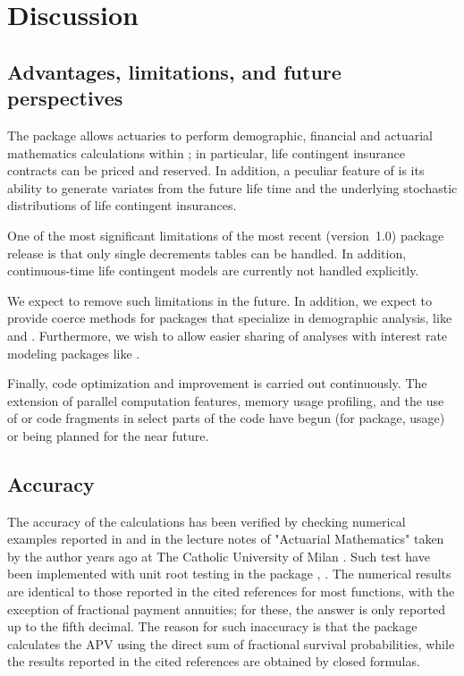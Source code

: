 \documentclass[nojss]{jss}
\begin{document}
\section{Discussion}\label{sec:discussion}
\subsection{Advantages, limitations, and future perspectives}

The  package allows actuaries to perform
demographic, financial and actuarial mathematics calculations within
; in particular, life contingent insurance contracts can
be priced and reserved. In addition, a peculiar feature of
 is its ability to generate variates from the
future life time and the underlying stochastic distributions of life
contingent insurances.

One of the most significant limitations of the most recent
(version~1.0)  package release is that only
single decrements tables can be handled.  In addition, continuous-time
life contingent models are currently not handled explicitly.

We expect to remove such limitations in the future. In addition, we
expect to provide coerce methods for packages that specialize in
demographic analysis, like  and
. Furthermore, we wish to allow easier sharing of
analyses with interest rate modeling packages like .

Finally, code optimization and improvement is carried out
continuously. The extension of parallel computation features, memory
usage profiling, and the use of  or  code
fragments in select parts of the code have begun (for  package, \cite{RcppR} usage) or being 
planned for the near future.

\subsection{Accuracy}\label{sec:disclaimer}

The accuracy of the calculations has been verified by checking
numerical examples reported in \cite{bowers1997actuarial} and in the
lecture notes of "Actuarial Mathematics" taken by the author years
ago at The Catholic University of Milan \citep{mazzoleni2000appunti}. Such test have been implemented with unit root testing in the package , \cite{pkg:testthat}.
The numerical results are identical to those reported in the cited
references for most functions, with the exception of fractional
payment annuities; for these, the answer is only reported up to the
fifth decimal. The reason for such inaccuracy is that the package
calculates the APV using the direct sum of fractional survival
probabilities, while the results reported in the cited references are
obtained by closed formulas.
\end{document}
